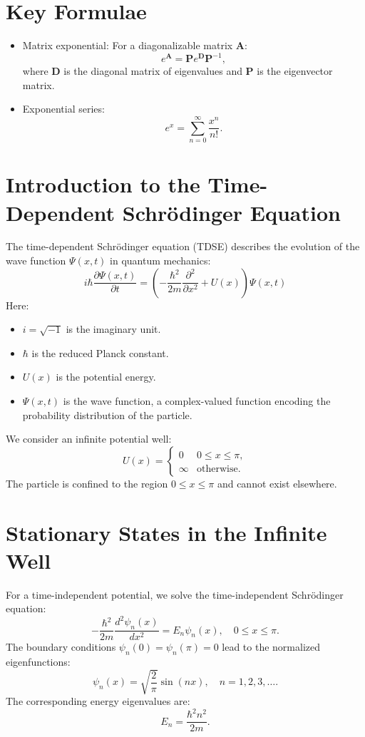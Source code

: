 \documentclass[a4paper,12pt]{article}
\begin{document}
\begin{multicols}{2}
\section{Key Formulae}
\begin{itemize}
\item Matrix exponential: For a diagonalizable matrix $\mathbf{A}$:
\[
e^{\mathbf{A}} = \mathbf{P} e^{\mathbf{D}} \mathbf{P}^{-1},
\]
where $\mathbf{D}$ is the diagonal matrix of eigenvalues and $\mathbf{P}$ is the eigenvector matrix.
\item Exponential series:
\[
e^x = \sum_{n=0}^\infty \frac{x^n}{n!}.
\]
\end{itemize}

\section{Introduction to the Time-Dependent Schrödinger Equation}
The time-dependent Schrödinger equation (TDSE) describes the evolution of the wave function $\Psi(x,t)$ in quantum mechanics:
\[
i\hbar \frac{\partial \Psi(x,t)}{\partial t} = \left( -\frac{\hbar^2}{2m} \frac{\partial^2}{\partial x^2} + U(x) \right) \Psi(x,t)
\]
Here:
\begin{itemize}
    \item $i = \sqrt{-1}$ is the imaginary unit.
    \item $\hbar$ is the reduced Planck constant.
    \item $U(x)$ is the potential energy.
    \item $\Psi(x,t)$ is the wave function, a complex-valued function encoding the probability distribution of the particle.
\end{itemize}

We consider an infinite potential well:
\[
U(x) = 
\begin{cases} 
0 & 0 \leq x \leq \pi, \\
\infty & \text{otherwise.}
\end{cases}
\]
The particle is confined to the region $0 \leq x \leq \pi$ and cannot exist elsewhere.

\section{Stationary States in the Infinite Well}
For a time-independent potential, we solve the time-independent Schrödinger equation:
\[
-\frac{\hbar^2}{2m} \frac{d^2 \psi_n(x)}{dx^2} = E_n \psi_n(x), \quad 0 \leq x \leq \pi.
\]
The boundary conditions $\psi_n(0) = \psi_n(\pi) = 0$ lead to the normalized eigenfunctions:
\[
\psi_n(x) = \sqrt{\frac{2}{\pi}} \sin(n x), \quad n = 1, 2, 3, \ldots.
\]
The corresponding energy eigenvalues are:
\[
E_n = \frac{\hbar^2 n^2}{2m}.
\]


\end{multicols}
\end{document}
